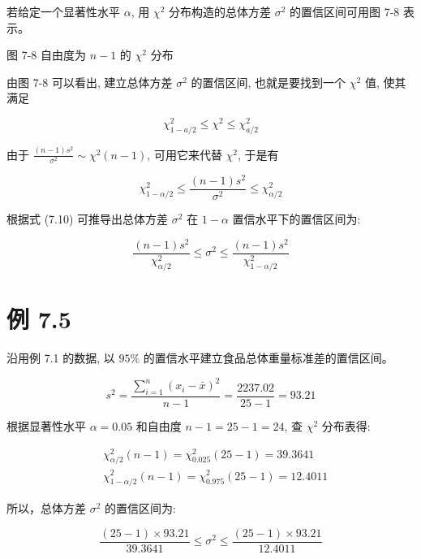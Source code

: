 \documentclass[10pt]{article}
\begin{document}
\begin{CJK*}{UTF8}{bsmi}
若给定一个显著性水平 $\alpha$, 用 $\chi^{2}$ 分布构造的总体方差 $\sigma^{2}$ 的置信区间可用图 7-8 表示。

\begin{center}
\end{center}

图 7-8 自由度为 $n-1$ 的 $\chi^{2}$ 分布

由图 7-8 可以看出, 建立总体方差 $\sigma^{2}$ 的置信区间, 也就是要找到一个 $\chi^{2}$ 值, 使其满足


\begin{equation*}
\chi_{1-a / 2}^{2} \leqslant \chi^{2} \leqslant \chi_{a / 2}^{2} \tag{7.9}
\end{equation*}


由于 $\frac{(n-1) s^{2}}{\sigma^{2}} \sim \chi^{2}(n-1)$, 可用它来代替 $\chi^{2}$, 于是有


\begin{equation*}
\chi_{1-\alpha / 2}^{2} \leqslant \frac{(n-1) s^{2}}{\sigma^{2}} \leqslant \chi_{\alpha / 2}^{2} \tag{7.10}
\end{equation*}


根据式 (7.10) 可推导出总体方差 $\sigma^{2}$ 在 $1-\alpha$ 置信水平下的置信区间为:


\begin{equation*}
\frac{(n-1) s^{2}}{\chi_{\alpha / 2}^{2}} \leqslant \sigma^{2} \leqslant \frac{(n-1) s^{2}}{\chi_{1-\alpha / 2}^{2}} \tag{7.11}
\end{equation*}


\section*{例 7.5}
沿用例 7.1 的数据, 以 $95 \%$ 的置信水平建立食品总体重量标准差的置信区间。

$$
s^{2}=\frac{\sum_{i=1}^{n}\left(x_{i}-\bar{x}\right)^{2}}{n-1}=\frac{2237.02}{25-1}=93.21
$$

根据显著性水平 $\alpha=0.05$ 和自由度 $n-1=25-1=24$, 查 $\chi^{2}$ 分布表得:

$$
\begin{aligned}
& \chi_{\alpha / 2}^{2}(n-1)=\chi_{0.025}^{2}(25-1)=39.3641 \\
& \chi_{1-\alpha / 2}^{2}(n-1)=\chi_{0.975}^{2}(25-1)=12.4011
\end{aligned}
$$

所以，总体方差 $\sigma^{2}$ 的置信区间为:

$$
\frac{(25-1) \times 93.21}{39.3641} \leqslant \sigma^{2} \leqslant \frac{(25-1) \times 93.21}{12.4011}
$$


\end{CJK*}
\end{document}
